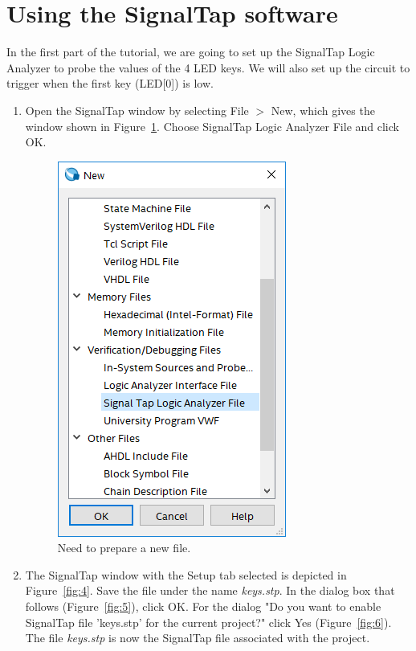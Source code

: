\documentclass[11pt, twoside, pdftex]{article}
\begin{document}
\section{Using the SignalTap software}

\noindent 
In the first part of the tutorial, we are going to set up the SignalTap Logic Analyzer to probe the values
of the 4 LED keys. We will also set up the circuit to trigger when the first key (LED[0]) is low. 
\begin{enumerate}
\item Open the SignalTap window by selecting
{\sf File $>$ New}, which gives the window shown in Figure~\ref{fig:3}.
Choose {\sf SignalTap Logic Analyzer File} and click {\sf OK}.

\begin{figure}[H]
   \begin{center}
      \includegraphics[scale=0.65]{figures/figure3.png}
   \caption{Need to prepare a new file.} 
	 \label{fig:3}
	 \end{center}
\end{figure}

\item The SignalTap window with the {\sf Setup} tab selected is depicted in Figure~\ref{fig:4}. Save the file under
the name {\it keys.stp}. In the dialog
box that follows (Figure~\ref{fig:5}), click {\sf OK}. For the dialog "Do you want to enable SignalTap file
'keys.stp' for the current project?" click {\sf Yes} (Figure~\ref{fig:6}). The file {\it keys.stp} is now the SignalTap 
file associated with the project. 


\end{enumerate}
\end{document}
